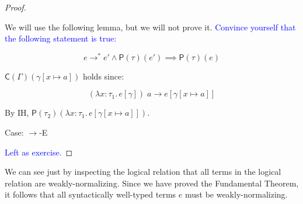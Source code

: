 \documentclass{lecturenotes}
\newcommand{\tabs}[3]{\ensuremath{\lambda #1 \colon #2.\,#3}}
\newcommand{\app}[2]{\ensuremath{#1\;#2}}
\newcommand{\lr}[2]{\ensuremath{\mathsf{P}(#1)(#2)}}
\newcommand{\gdsubst}[2]{\ensuremath{\mathsf{C}(#1)(#2)}}
\begin{document}
\begin{proof}
\begin{enumerate}[(1)]
    We will use the following lemma, but we will not prove it.
    \textcolor{blue}{Convince yourself that the following statement is true:}

    $$e \to^\ast e' \land \lr{\tau}{e'} \implies \lr{\tau}{e}$$

    \begin{nb}
      $\gdsubst{\Gamma}{\gamma[x \mapsto a]}$ holds since:

      $$\app{(\tabs{x}{\tau_1}{e[\gamma]})}{a} \to e[\gamma[x \mapsto a]]$$
    \end{nb}

    By IH, $\lr{\tau_2}{\tabs{x}{\tau_1}{e[\gamma[x \mapsto a]]}}$.

  \end{enumerate}

  \item Case: \textsc{$\rightarrow$-E}
  
  \textcolor{blue}{Left as exercise.}

\end{proof}

We can see just by inspecting the logical relation that all terms in the logical relation are weakly-normalizing.
Since we have proved the Fundamental Theorem, it follows that all syntactically well-typed terms $e$ must be weakly-normalizing.
\end{document}
